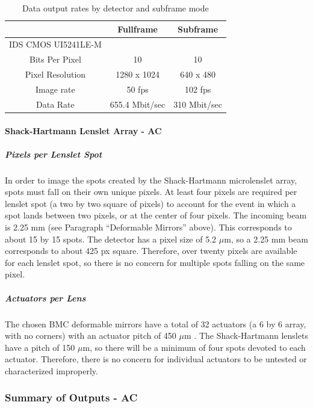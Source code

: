 \documentclass[12pt]{article}
\begin{document}
\begin{table}
\begin{center}
\caption{Data output rates by detector and subframe mode}
\begin{tabular}{|c||c|c|} 
\hline
& Fullframe & Subframe \\
\hline
IDS CMOS UI5241LE-M  &  &   \\
\hline
Bits Per Pixel &  10 & 10\\
Pixel Resolution  & 1280 x 1024 & 640 x 480 \\
Image rate &  50 fps & 102 fps\\
Data Rate & 655.4 Mbit/sec & 310 Mbit/sec \\
\hline
\end{tabular}\label{table:payload-data-rates}
\end{center}
\end{table}

\paragraph{Shack-Hartmann Lenslet Array - AC}
			
\subparagraph{Pixels per Lenslet Spot}\label{sec:payload_pixels}
In order to image the spots created by the Shack-Hartmann microlenslet array, spots must fall on their own unique pixels.  At least four pixels are required per lenslet spot (a two by two square of pixels) to account for the event in which a spot lands between two pixels, or at the center of four pixels.
The incoming beam is 2.25 mm (see Paragraph ``Deformable Mirrors'' above).  This corresponds to about 15 by 15 spots. The detector has a pixel size of 5.2 $\mu$m, so a 2.25 mm beam corresponds to about 425 px square.  Therefore, over twenty pixels are available for each lenslet spot, so there is no concern for multiple spots falling on the same pixel. 
				
				\subparagraph{Actuators per Lens}
The chosen BMC deformable mirrors have a total of 32 actuators (a 6 by 6 array, with no corners) with an actuator pitch of 450 $\mu$m \cite{BMC}.  The Shack-Hartmann lenslets have a pitch of 150 $\mu$m, so there will be a minimum of four spots devoted to each actuator.  Therefore, there is no concern for individual actuators to be untested or characterized improperly.

\subsubsection{Summary of Outputs - AC}
\end{document}
